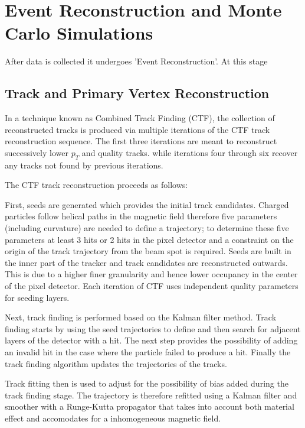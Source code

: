 \chapter{Event Reconstruction and Monte Carlo Simulations}
After data is collected it undergoes 'Event Reconstruction'.
At this stage %

\section{Track and Primary Vertex Reconstruction}
In a technique known as Combined Track Finding (CTF),
the collection of reconstructed tracks is produced via
multiple iterations of the CTF track reconstruction sequence.
The first three iterations are meant to reconstruct successively
lower $p_{T}$ and quality tracks.%
while iterations four through six recover any tracks 
not found by previous iterations.

The CTF track reconstruction proceeds as follows:
\item First, seeds are generated which provides the initial track candidates.
Charged particles follow helical paths in the magnetic field therefore five parameters (including curvature)
are needed to define a trajectory; to determine these five parameters at least
3 hits or 2 hits in the pixel detector and a constraint on the origin of the track trajectory from the beam
spot is required. Seeds are built in the inner part of the tracker
and track candidates are reconstructed outwards. This is due to a higher finer granularity 
and hence lower occupancy in the center of the pixel detector. Each iteration of CTF
uses independent quality parameters for seeding layers. %
%
\item Next, track finding is performed based on the Kalman filter method. %
Track finding starts by using the seed trajectories to define and then search
for adjacent layers of the detector with a hit. The next step provides the possibility
of adding an invalid hit in the case where the particle failed to produce a hit.
Finally the track finding algorithm updates the trajectories of the tracks. 
\item Track fitting then is used to adjust for the possibility of bias added during the track
finding stage. The trajectory is therefore refitted using a Kalman filter and smoother with
a Runge-Kutta propagator that takes into account both material effect and accomodates
for a inhomogeneous magnetic field.
\item

